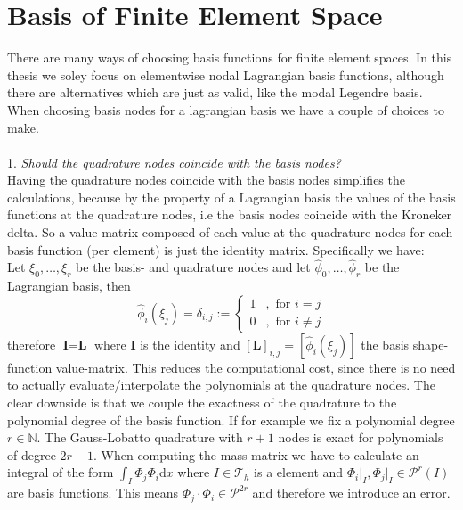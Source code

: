 \section{Basis of Finite Element Space}
\label{sec:ell_basis}
There are many ways of choosing basis functions for finite element spaces. In this thesis we soley focus on elementwise nodal Lagrangian basis functions, although there are alternatives
which are just as valid, like the modal Legendre basis.
When choosing basis nodes for a lagrangian basis we have a couple of choices to make. \\ \\
1. \textit{Should the quadrature nodes coincide with the basis nodes?} \\
Having the quadrature nodes coincide with the basis nodes simplifies the calculations, because by the property of a Lagrangian basis the values of the basis functions at the quadrature nodes,
i.e the basis nodes coincide with the Kroneker delta. So a value matrix composed of each value at the quadrature nodes for each basis function (per element) is just
the identity matrix. Specifically we have: \\
Let $\xi_0,\ldots,\xi_r$ be the basis- and quadrature nodes and let $ \widehat{\phi}_0,\ldots,\widehat{\phi}_r$ be the Lagrangian basis, then 
\begin{equation*}
	\widehat{\phi}_i(\xi_j) = \delta_{i,j} := 
	\begin{cases}
		1	&,\text{ for }i=j \\
		0  &,\text{ for }i\neq j
	\end{cases}
\end{equation*}
therefore $\textbf{I} = \textbf{L}$ where $\textbf{I}$ is the identity and $ [\textbf{L}]_{i,j} = [\widehat{\phi}_i(\xi_j)] $ the basis shape-function value-matrix.
This reduces the computational cost, since there is no need to actually evaluate/interpolate the polynomials at the quadrature nodes. 
The clear downside is that we couple the exactness of the quadrature to the polynomial degree of the basis function. If for example we fix a polynomial degree $r \in \mathbb{N}$.
The Gauss-Lobatto quadrature with $r+1$ nodes is exact for polynomials of degree $2r-1$. When computing the mass matrix we have to calculate an 
integral of the form $ \int_I \Phi_j \Phi_i \text{d}x $ where $I \in \mathcal{T}_h$ is a element and $\Phi_i \vert_I, \Phi_j \vert_I \in \mathcal{P}^r(I)$ are basis functions.
This means $ \Phi_j \cdot \Phi_i \in  \mathcal{P}^{2r}$ and therefore we introduce an error. \\

